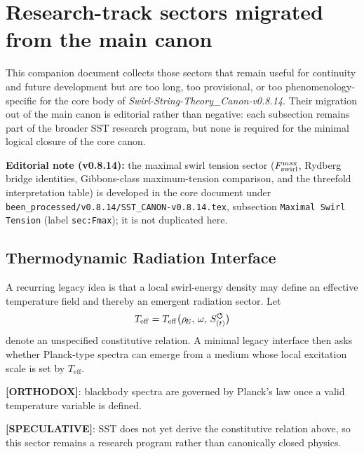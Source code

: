 
\section{Research-track sectors migrated from the main canon}

\noindent
This companion document collects those sectors that remain useful for continuity and future development but are too long, too provisional, or too phenomenology-specific for the core body of \textit{Swirl-String-Theory\_Canon-v0.8.14}. Their migration out of the main canon is editorial rather than negative: each subsection remains part of the broader SST research program, but none is required for the minimal logical closure of the core canon.

\medskip
\noindent
\textbf{Editorial note (v0.8.14):} the maximal swirl tension sector ($F_{\rm swirl}^{\max}$, Rydberg bridge identities, Gibbons-class maximum-tension comparison, and the threefold interpretation table) is developed in the core document under \verb|been_processed/v0.8.14/SST_CANON-v0.8.14.tex|, subsection \texttt{Maximal Swirl Tension} (label \texttt{sec:Fmax}); it is not duplicated here.

\medskip








\subsection{Thermodynamic Radiation Interface}
A recurring legacy idea is that a local swirl-energy density may define an effective temperature field and thereby an emergent radiation sector. Let
\begin{align}
    T_{\mathrm{eff}} = T_{\mathrm{eff}}\big(\rho_{\!E},\, \omega,\, {S_{(t)}^{\boldsymbol{\circlearrowleft}}}\big)
\end{align}
denote an unspecified constitutive relation. A minimal legacy interface then asks whether Planck-type spectra can emerge from a medium whose local excitation scale is set by $T_{\mathrm{eff}}$.

\textbf{[ORTHODOX]}: blackbody spectra are governed by Planck's law once a valid temperature variable is defined.

\textbf{[SPECULATIVE]}: SST does not yet derive the constitutive relation above, so this sector remains a research program rather than canonically closed physics.

